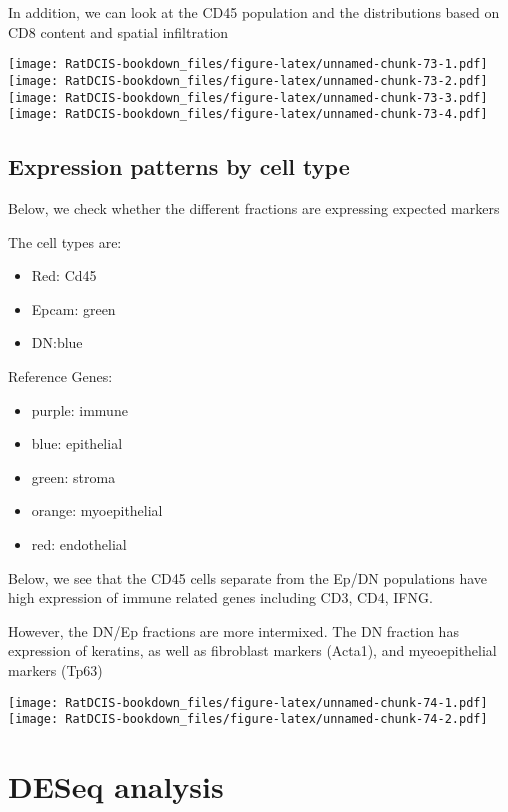\documentclass[
]{book}
\providecommand{\tightlist}{%
  \setlength{\itemsep}{0pt}\setlength{\parskip}{0pt}}
\begin{document}
In addition, we can look at the CD45 population and the distributions based on CD8 content and spatial infiltration

\texttt{[image: RatDCIS-bookdown\_files/figure-latex/unnamed-chunk-73-1.pdf]} \texttt{[image: RatDCIS-bookdown\_files/figure-latex/unnamed-chunk-73-2.pdf]} \texttt{[image: RatDCIS-bookdown\_files/figure-latex/unnamed-chunk-73-3.pdf]} \texttt{[image: RatDCIS-bookdown\_files/figure-latex/unnamed-chunk-73-4.pdf]}

\hypertarget{expression-patterns-by-cell-type}{%
\section{Expression patterns by cell type}\label{expression-patterns-by-cell-type}}

Below, we check whether the different fractions are expressing expected markers

The cell types are:

\begin{itemize}
\tightlist
\item
  Red: Cd45
\item
  Epcam: green
\item
  DN:blue
\end{itemize}

Reference Genes:

\begin{itemize}
\tightlist
\item
  purple: immune
\item
  blue: epithelial
\item
  green: stroma
\item
  orange: myoepithelial
\item
  red: endothelial
\end{itemize}

Below, we see that the CD45 cells separate from the Ep/DN populations have high expression of immune related genes including CD3, CD4, IFNG.

However, the DN/Ep fractions are more intermixed. The DN fraction has expression of keratins, as well as fibroblast markers (Acta1), and myeoepithelial markers (Tp63)

\texttt{[image: RatDCIS-bookdown\_files/figure-latex/unnamed-chunk-74-1.pdf]} \texttt{[image: RatDCIS-bookdown\_files/figure-latex/unnamed-chunk-74-2.pdf]}

\hypertarget{deseq-analysis}{%
\chapter{DESeq analysis}\label{deseq-analysis}}
\end{document}
